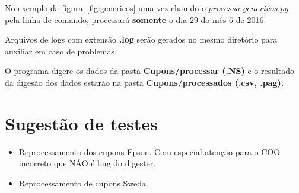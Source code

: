 \documentclass{article}      %
\begin{document}
No exemplo da figura~\ref{fig:genericos} uma vez chamdo o $processa\_genericos.py$ pela linha de comando, processará \textbf{somente} o dia 29 do mês 6 de 2016.

Arquivos de logs com extensão \textbf{.log} serão gerados no mesmo diretório para auxiliar em caso de problemas.

O programa digere os dados da pasta \textbf{Cupons/processar (.NS)} e o resultado da digesão dos dados estarão na pasta \textbf{Cupons/processados (.csv, .pag).}



\section{Sugestão de testes}

\begin{itemize}
    \item Reprocessamento dos cupons Epson. Com especial atenção para o COO incorreto que NÃO é bug do digester.
    \item Reprocessamento de cupons Sweda.
\end{itemize}
\end{document}
